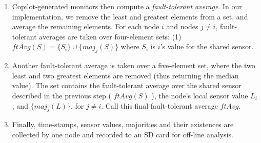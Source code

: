 \begin{enumerate}



\item Copilot-generated monitors then compute a \emph{fault-tolerant average}.
  In our implementation, we remove the least and greatest elements from a set,
  and average the remaining elements.  For each node $i$ and nodes $j \neq i$, fault-tolerant
  averages are taken over four-element sets:
  (1) $ftAvg(S) = \{S_i \} \cup \{maj_j(S)\}$ where $S_i$ is $i$'s value for the shared
  sensor.

\item Another fault-tolerant average is taken over a five-element set, where the
  two least and two greatest elements are removed (thus returning the median
  value).  The set contains the fault-tolerant average over the shared sensor
  described in the previous step ( $ftAvg(S)$ ), the node's local sensor value $L_i$, and
  $\{maj_j(L)\}$, for $j \neq i$.  Call this final fault-tolerant average $ftAvg$.



\item Finally, time-stamps, sensor values, majorities and their existences are
  collected by one node and recorded to an SD card for off-line analysis.

\end{enumerate}

